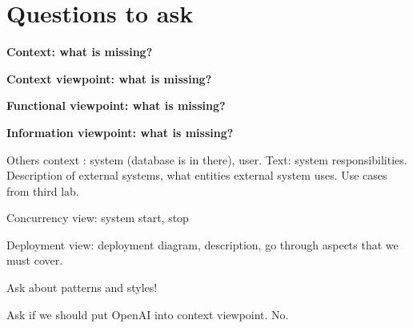 \documentclass[a4paper,12pt]{article}
\begin{document}
\tableofcontents
\newpage

\section{Questions to ask}

\textbf{Context: what is missing?}

\textbf{Context viewpoint: what is missing?}

\textbf{Functional viewpoint: what is missing?}

\textbf{Information viewpoint: what is missing?}

Others context : system (database is in there), user. Text: system responsibilities. Description of external systems, what entities external system uses. Use cases from third lab.

Concurrency view: system start, stop

Deployment view: deployment diagram, description, go through aspects that we must cover.

Ask about patterns and styles!

Ask if we should put OpenAI into context viewpoint. No.






% 





\listoffigures
\end{document}
